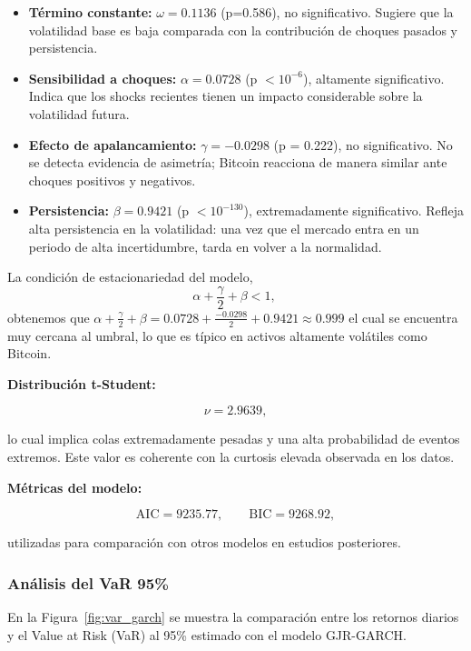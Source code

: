 \documentclass[
]{ceurart}
\begin{document}
\begin{itemize}
    \item \textbf{Término constante:} $\omega = 0.1136$ (p=0.586), no significativo. Sugiere que la volatilidad base es baja comparada con la contribución de choques pasados y persistencia.

    \item \textbf{Sensibilidad a choques:} $\alpha = 0.0728$ (p $<10^{-6}$), altamente significativo. Indica que los shocks recientes tienen un impacto considerable sobre la volatilidad futura.

    \item \textbf{Efecto de apalancamiento:} $\gamma = -0.0298$ (p = 0.222), no significativo. No se detecta evidencia de asimetría; Bitcoin reacciona de manera similar ante choques positivos y negativos.

    \item \textbf{Persistencia:} $\beta = 0.9421$ (p $< 10^{-130}$), extremadamente significativo. Refleja alta persistencia en la volatilidad: una vez que el mercado entra en un periodo de alta incertidumbre, tarda en volver a la normalidad.
\end{itemize}

La condición de estacionariedad del modelo,
\[
\alpha + \frac{\gamma}{2} + \beta < 1, \
\]
obtenemos que \( \alpha + \frac{\gamma}{2} + \beta
= 0.0728 + \frac{-0.0298}{2} + 0.9421
\approx 0.999 \) el cual se encuentra muy cercana al umbral, lo que es típico en activos altamente volátiles como Bitcoin.

\vspace{0.3cm}
\noindent\textbf{Distribución t-Student:}

\[
\nu = 2.9639,
\]

lo cual implica colas extremadamente pesadas y una alta probabilidad de eventos extremos. Este valor es coherente con la curtosis elevada observada en los datos.

\vspace{0.3cm}
\noindent\textbf{Métricas del modelo:}

\[
\text{AIC} = 9235.77, \qquad \text{BIC} = 9268.92,
\]

utilizadas para comparación con otros modelos en estudios posteriores.

\subsubsection{Análisis del VaR 95\%}

En la Figura~\ref{fig:var_garch} se muestra la comparación entre los retornos diarios y el Value at Risk (VaR) al 95\% estimado con el modelo GJR-GARCH.
\end{document}
